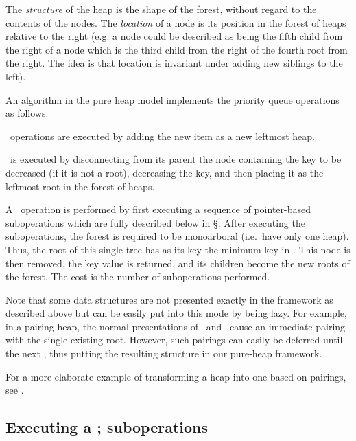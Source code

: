 The \emph{structure} of the heap is the shape of the forest, without regard to the contents of the nodes. The \emph{location} of a node is its position in the forest of heaps relative to the right (e.g. a node could be described as being the fifth child from the right of a node which is the third child from the right of the fourth root from the right. The idea is that location is invariant under adding new siblings to the left).

An algorithm in the pure heap model implements the priority queue operations as follows:
\shortfull{}\item \opIns\ operations are executed by adding the new item as a new leftmost heap. 
\shortfull{}\item \opDc\ is executed  by disconnecting from its parent the node containing the key to be decreased (if it is not a root), decreasing the key, and then placing it as the leftmost root in the forest of heaps. 
\shortfull{}\item A \opEm\ operation is performed by first executing a sequence of pointer-based suboperations which are fully described below in \S{}. After executing the suboperations, the forest is required to be monoarboral (i.e.~have only one heap). 
Thus, the root of this single tree has as its key the minimum key in . This node is then removed, the key value is returned, and its children become the new roots of the forest. The cost is the number of suboperations performed. 


Note that some data structures are not presented exactly in the framework as described above but can be easily put into this mode by being lazy. For example, in a pairing heap, the normal presentations of \opIns\ and \opDc\ cause an immediate pairing with the single existing root. However, such pairings can easily be deferred until the next \opEm, thus putting the resulting structure in our pure-heap framework. 
\begin{fullonly}
For a more elaborate example of transforming a heap into one based on pairings, see \cite{DBLP:conf/wae/Fredman99}.
\end{fullonly}




\subsection{Executing a \opEm; suboperations} 

